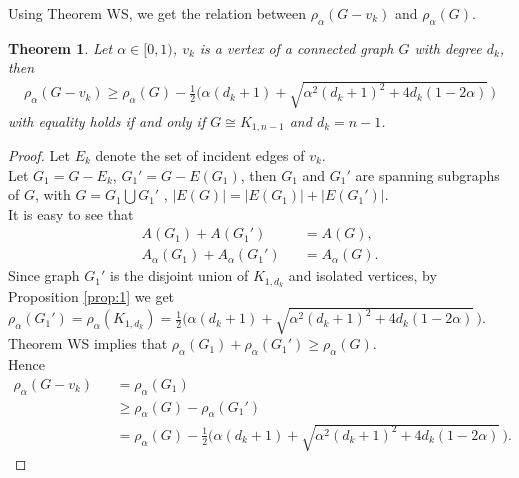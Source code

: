 \documentclass[amsthm]{elsart}
\newtheorem{theorem}{Theorem}[section]
\begin{document}
Using Theorem WS, we get the relation between $\rho _\alpha (G - v_k)$ and $\rho _\alpha (G)$.
\begin{theorem} \label{the:0}
Let $\alpha \in [0, 1)$, $v_k$ is a vertex of a connected graph $G$ with degree $d_k$, then
\begin{eqnarray*}
\rho _\alpha (G - v_k) \geqslant \rho _\alpha (G) - \frac{1}{2} \big( \alpha (d_k + 1) + \sqrt{\alpha ^2 (d_k + 1)^2 + 4 d_k (1-2\alpha)} \, \big)
\end{eqnarray*}
with equality holds if and only if $G \cong K_{1,n-1}$ and $d_k = n - 1$.
\end{theorem}
\begin{proof} Let $E_k $ denote the set of incident edges of $v_k$.
 \\ Let $G_1 = G - E_k$, $G_1' = G - E(G_1)$,
 then $G_1$ and $G_1'$ are spanning subgraphs of $G$, with
 $G = G_1 \bigcup G_1'$ ,
 $|E(G)| = |E(G_1)| + |E(G_1')|$.
\\ It is easy to see that
\begin{eqnarray*}
 A(G_1) + A(G_1') \quad &&= A(G),
\\  A_\alpha (G_1) + A_\alpha (G_1') &&= A_\alpha (G).
\end{eqnarray*}
 Since graph $G_1'$ is the disjoint union of $K_{1,d_k}$ and isolated vertices, by Proposition \ref{prop:1} we get $\rho _\alpha (G_1') = \rho _\alpha (K_{1,d_k}) = \frac{1}{2} \big( \alpha (d_k + 1) + \sqrt{\alpha ^2 (d_k + 1)^2 + 4 d_k (1-2\alpha)} \, \big). $
\\ Theorem WS implies that $\rho _\alpha (G_1) + \rho _\alpha (G_1') \geqslant \rho _\alpha (G)$.
\\ Hence
\begin{eqnarray*}
\rho _\alpha (G - v_k) &&= \rho _\alpha (G_1)
\\ && \geqslant \rho _\alpha (G) - \rho _\alpha (G_1')
\\ && = \rho _\alpha (G) - \frac{1}{2} \big( \alpha (d_k + 1) + \sqrt{\alpha ^2 (d_k + 1)^2 + 4 d_k (1-2\alpha)} \, \big).
\end{eqnarray*}


\end{proof}
\end{document}

